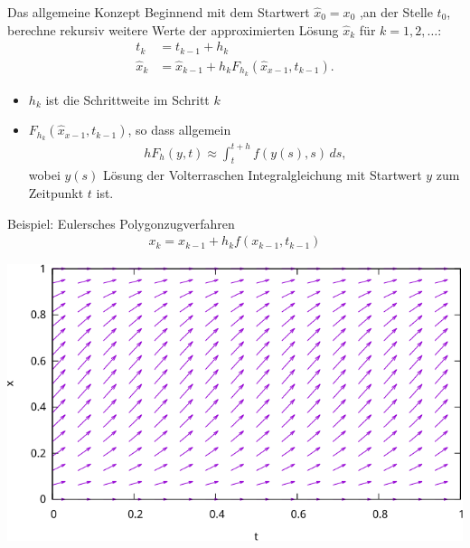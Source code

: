 \begin{frame}{Das allgemeine Konzept}
  Beginnend mit dem Startwert $\hat x_0 = x_0$ ,an der Stelle $t_0$,
  berechne rekursiv weitere Werte der approximierten Lösung $\hat x_k$ für $k=1,2,\ldots$:
  \begin{align*}
    t_k &= t_{k-1} + h_k\\
    \hat x_k &= \hat x_{k-1} + h_k F_{h_k}(\hat x_{x-1},t_{k-1}).
  \end{align*}
  \begin{itemize}
  \item $h_k$ ist die Schrittweite im Schritt $k$
  \item $F_{h_k}(\hat x_{x-1},t_{k-1})$, so dass allgemein
    \begin{gather*}
      h F_{h}(y,t) \approx \int_t^{t+h} f(y(s),s)\,ds,
    \end{gather*}
    wobei $y(s)$ Lösung der Volterraschen Integralgleichung mit
    Startwert $y$ zum Zeitpunkt $t$ ist.
  \end{itemize}
\end{frame}

\begin{frame}{Beispiel: Eulersches Polygonzugverfahren}
  \begin{gather*}
    x_{k} = x_{k-1} + h_k f(x_{k-1},t_{k-1})
  \end{gather*}
  \begin{center}
    \includegraphics[width=.6\textwidth]{fig/euler-logistic.pdf}
  \end{center}
\end{frame}

